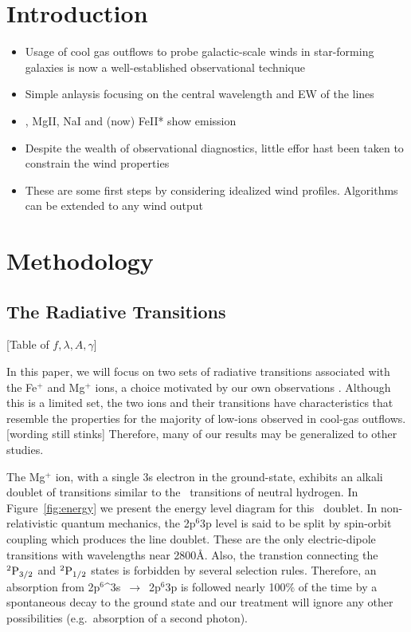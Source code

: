 \documentclass[12pt,preprint]{aastex}
\begin{document}

\section{Introduction}

\begin{itemize}
\item Usage of cool gas outflows to probe galactic-scale winds in
  star-forming galaxies is now a well-established observational
  technique
\item Simple anlaysis focusing on the central wavelength and EW of the
  lines
\item \lya, MgII, NaI and (now) FeII* show emission
\item Despite the wealth of observational diagnostics, little effor
  hast been taken to constrain the wind properties
\item These are some first steps by considering idealized wind
  profiles.  Algorithms can be extended to any wind output
\end{itemize}

\section{Methodology}
\label{sec:method}

\subsection{The Radiative Transitions}

[Table of $f,\lambda,A,\gamma$]

In this paper, we will focus on two sets of radiative transitions
associated with the Fe$^+$ and Mg$^+$ ions, a choice motivated by 
our own observations \citep{rubin10b}.  Although this is a limited
set, the two ions and their transitions have 
characteristics that resemble the properties for the majority of low-ions 
observed in cool-gas outflows. [wording still stinks] Therefore, many
of our results may be generalized to other studies.

The Mg$^+$ ion, with a single 3s electron in the ground-state,
exhibits an alkali doublet of transitions similar to the
\lya\ transitions of neutral hydrogen.  In Figure~\ref{fig:energy}
we present the energy level diagram for this 
\mgiid\ doublet.  In non-relativistic quantum
mechanics, the 2p$^6$3p level is said to be split by spin-orbit
coupling which produces the line doublet.  These are the only
 electric-dipole transitions 
with wavelengths near 2800\AA. Also, the transtion connecting
the $\rm {}^2P_{3/2}$ and $\rm {}^2P_{1/2}$ states is forbidden by several
selection rules.  Therefore, an absorption from
2p$^6$^3s~$\to$~2p$^6$3p 
is followed nearly 100$\%$ of the time by a spontaneous decay to the
ground state and our treatment will ignore any other possibilities
(e.g.\ absorption of a second photon).
\end{document}
